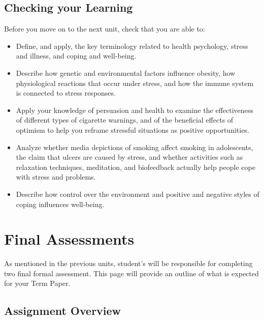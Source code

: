 \documentclass[
]{book}
\begin{document}
\hypertarget{checking-your-learning-10}{%
\section*{Checking your Learning}\label{checking-your-learning-10}}

\begin{progress}
Before you move on to the next unit, check that you are able to:

\begin{itemize}
\item
  Define, and apply, the key terminology related to health psychology, stress and illness, and coping and well-being.
\item
  Describe how genetic and environmental factors influence obesity, how physiological reactions that occur under stress, and how the immune system is connected to stress responses.
\item
  Apply your knowledge of persuasion and health to examine the effectiveness of different types of cigarette warnings, and of the beneficial effects of optimism to help you reframe stressful situations as positive opportunities.
\item
  Analyze whether media depictions of smoking affect smoking in adolescents, the claim that ulcers are caused by stress, and whether activities such as relaxation techniques, meditation, and biofeedback actually help people cope with stress and problems.
\item
  Describe how control over the environment and positive and negative styles of coping influences well-being.
\end{itemize}
\end{progress}

\hypertarget{final-assessments}{%
\chapter{Final Assessments}\label{final-assessments}}

As mentioned in the previous units, student's will be responsible for completing two final formal assessment. This page will provide an outline of what is expected for your Term Paper.

\hypertarget{assignment-overview}{%
\section*{Assignment Overview}\label{assignment-overview}}
\end{document}
